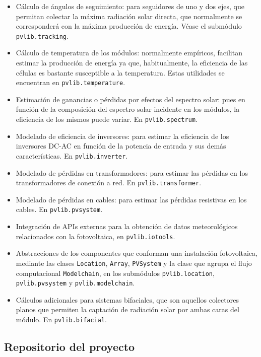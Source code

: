 \begin{itemize}
      \item Cálculo de ángulos de seguimiento: para seguidores de uno y dos ejes, que permitan colectar la máxima radiación solar directa, que normalmente se corresponderá con la máxima producción de energía. Véase el submódulo \lstinline{pvlib.tracking}.
      \item Cálculo de temperatura de los módulos: normalmente empíricos, facilitan estimar la producción de energía ya que, habitualmente, la eficiencia de las células es bastante susceptible a la temperatura. Estas utilidades se encuentran en \lstinline{pvlib.temperature}.
      \item Estimación de ganancias o pérdidas por efectos del espectro solar: pues en función de la composición del espectro solar incidente en los módulos, la eficiencia de los mismos puede variar. En \lstinline{pvlib.spectrum}.
      \item Modelado de eficiencia de inversores: para estimar la eficiencia de los inversores DC-AC en función de la potencia de entrada y sus demás características. En \lstinline{pvlib.inverter}.
      \item Modelado de pérdidas en transformadores: para estimar las pérdidas en los transformadores de conexión a red. En \lstinline{pvlib.transformer}.
      \item Modelado de pérdidas en cables: para estimar las pérdidas resistivas en los cables. En \lstinline{pvlib.pvsystem}.
      \item Integración de APIs externas para la obtención de datos meteorológicos relacionados con la fotovoltaica, en \lstinline{pvlib.iotools}.
      \item Abstracciones de los componentes que conforman una instalación fotovoltaica, mediante las clases \lstinline{Location}, \lstinline{Array}, \lstinline{PVSystem} y la clase que agrupa el flujo computacional \lstinline{Modelchain}, en los submódulos \lstinline{pvlib.location}, \lstinline{pvlib.pvsystem} y \lstinline{pvlib.modelchain}.
      \item Cálculos adicionales para sistemas bifaciales, que son aquellos colectores planos que permiten la captación de radiación solar por ambas caras del módulo. En \lstinline{pvlib.bifacial}.

\end{itemize}

\subsection{Repositorio del proyecto} \label{ssct:pvlib:repositorio}

